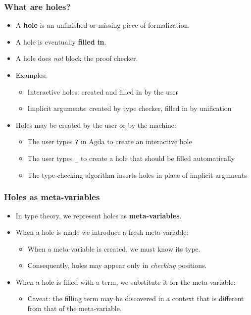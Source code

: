 \documentclass[handout,10pt,aspectratio=169]{beamer}
\begin{document}
\begin{frame}
  \frametitle{What are holes?}

  \begin{itemize}
  \item A \textbf{hole} is an unfinished or missing piece of formalization.
  \item A hole is eventually \textbf{filled in}.
  \item A hole does \emph{not} block the proof checker.
  \pause
  \item Examples:
    \begin{itemize}
    \item Interactive holes: created and filled in by the user
    \item Implicit arguments: created by type checker, filled in by unification
    \end{itemize}
  \pause
  \item Holes may be created by the user or by the machine:
    \begin{itemize}
    \item The user types \lstinline{?} in Agda to create an interactive hole
    \item The user types \lstinline{_} to create a hole that should be filled automatically
    \item The type-checking algorithm inserts holes in place of implicit arguments
    \end{itemize}
  \pause
  \end{itemize}

\end{frame}

\begin{frame}
  \frametitle{Holes as meta-variables}

  \begin{itemize}
  \item In type theory, we represent holes as \textbf{meta-variables}.
  \item When a hole is made we introduce a fresh meta-variable:
    \begin{itemize}
    \item When a meta-variable is created, we must know its type.
    \item Consequently, holes may appear only in \emph{checking} positions.
    \end{itemize}
  \pause
  \item When a hole is filled with a term, we substitute it for the meta-variable:
    \begin{itemize}
    \item Caveat: the filling term may be discovered in a context that is different
      from that of the meta-variable.
    \end{itemize}
  \end{itemize}
\end{frame}
\end{document}
